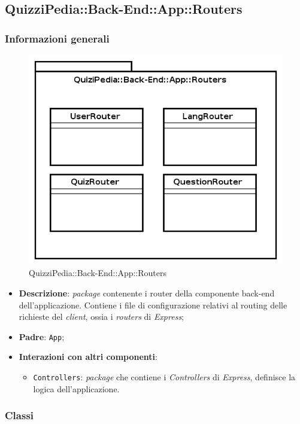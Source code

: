\subsection{QuizziPedia::Back-End::App::Routers}
\subsubsection{Informazioni generali}
\label{QuizziPedia::Back-End::App::Routers}
\begin{figure}[ht]
	\centering
	\includegraphics[scale=0.7]{UML/Package/QuizziPedia_Back-End_App_Routers.png}
	\caption{QuizziPedia::Back-End::App::Routers}
\end{figure}
\FloatBarrier
	\begin{itemize}
		\item \textbf{Descrizione}: 
		\textit{package} contenente i router della componente back-end dell'applicazione. Contiene i file di configurazione relativi al routing delle richieste del \textit{client}, ossia i \textit{routers} di \textit{Express};
		\item \textbf{Padre}: \texttt{App};
		\item \textbf{Interazioni con altri componenti}:
			\begin{itemize}
				\item \texttt{Controllers}: \textit{package} che contiene i \textit{Controllers} di \textit{Express}, definisce la logica dell'applicazione.
			\end{itemize}
	\end{itemize}
\subsubsection{Classi}





